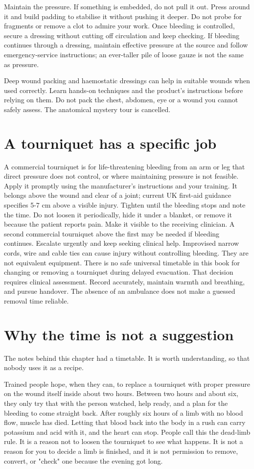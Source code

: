 \documentclass[10pt,openright]{book}
\begin{document}
Maintain the pressure. If something is embedded, do not pull it out. Press around it and build padding to stabilise it without pushing it deeper. Do not probe for fragments or remove a clot to admire your work. Once bleeding is controlled, secure a dressing without cutting off circulation and keep checking. If bleeding continues through a dressing, maintain effective pressure at the source and follow emergency-service instructions; an ever-taller pile of loose gauze is not the same as pressure.

Deep wound packing and haemostatic dressings can help in suitable wounds when used correctly. Learn hands-on techniques and the product's instructions before relying on them. Do not pack the chest, abdomen, eye or a wound you cannot safely assess. The anatomical mystery tour is cancelled.

\section*{A tourniquet has a specific job}
A commercial tourniquet is for life-threatening bleeding from an arm or leg that direct pressure does not control, or where maintaining pressure is not feasible. Apply it promptly using the manufacturer's instructions and your training. It belongs above the wound and clear of a joint; current UK first-aid guidance specifies 5-7 cm above a visible injury. Tighten until the bleeding stops and note the time. Do not loosen it periodically, hide it under a blanket, or remove it because the patient reports pain. Make it visible to the receiving clinician. A second commercial tourniquet above the first may be needed if bleeding continues. Escalate urgently and keep seeking clinical help. Improvised narrow cords, wire and cable ties can cause injury without controlling bleeding. They are not equivalent equipment. There is no safe universal timetable in this book for changing or removing a tourniquet during delayed evacuation. That decision requires clinical assessment. Record accurately, maintain warmth and breathing, and pursue handover. The absence of an ambulance does not make a guessed removal time reliable.

\section*{Why the time is not a suggestion}
The notes behind this chapter had a timetable. It is worth understanding, so that nobody uses it as a recipe.

Trained people hope, when they can, to replace a tourniquet with proper pressure on the wound itself inside about two hours. Between two hours and about six, they only try that with the person watched, help ready, and a plan for the bleeding to come straight back. After roughly six hours of a limb with no blood flow, muscle has died. Letting that blood back into the body in a rush can carry potassium and acid with it, and the heart can stop. People call this the dead-limb rule. It is a reason not to loosen the tourniquet to see what happens. It is not a reason for you to decide a limb is finished, and it is not permission to remove, convert, or "check" one because the evening got long.
\end{document}

